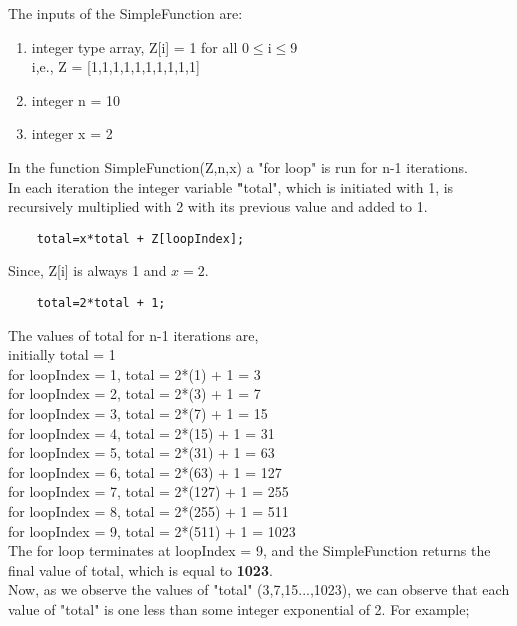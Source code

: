 \documentclass[journal,12pt,twocolumn]{IEEEtran}
\begin{document}
The inputs of the SimpleFunction are:
\begin{enumerate}
    \item integer type array, Z[i] = 1 for all 0$\le$i$\le$9 \\
    i,e., Z = [1,1,1,1,1,1,1,1,1,1] 
    \item integer n = 10
    \item integer x = 2
\end{enumerate}

In the function SimpleFunction(Z,n,x) a "for loop" is run for n-1 iterations. \\
In each iteration the integer variable {\textbf "total"}, which is initiated with 1, is recursively multiplied with 2 with its previous value and added to 1.\\
\begin{lstlisting}
    total=x*total + Z[loopIndex];
\end{lstlisting}
Since, Z[i] is always 1 and $x = 2$.\\
\begin{lstlisting}
    total=2*total + 1;
\end{lstlisting}

The values of total for n-1 iterations are,\\
initially total = 1\\
for loopIndex = 1, total = 2*(1) + 1 = 3\\
for loopIndex = 2, total = 2*(3) + 1 = 7\\
for loopIndex = 3, total = 2*(7) + 1 = 15\\
for loopIndex = 4, total = 2*(15) + 1 = 31\\
for loopIndex = 5, total = 2*(31) + 1 = 63\\
for loopIndex = 6, total = 2*(63) + 1 = 127\\
for loopIndex = 7, total = 2*(127) + 1 = 255\\
for loopIndex = 8, total = 2*(255) + 1 = 511\\
for loopIndex = 9, total = 2*(511) + 1 = 1023\\

The for loop terminates at loopIndex = 9, and the SimpleFunction returns the final value of total, which is equal to \textbf{1023}.\\

Now, as we observe the values of "total" (3,7,15...,1023), we can observe that each value of "total" is one less than some integer exponential of 2. For example; \\ 
\end{document}
